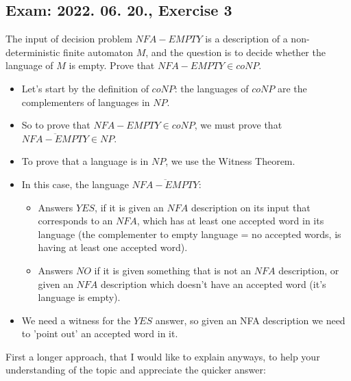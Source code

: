 \subsection{Exam: 2022. 06. 20., Exercise 3}


The input of decision problem $NFA-EMPTY$ is a description of a non-deterministic finite automaton $M$, and the question is to decide whether the language of $M$ is empty. Prove that $NFA-EMPTY \in{} coNP$.


\begin{itemize}
    \item Let's start by the definition of $coNP$: the languages of $coNP$ are the complementers of languages in $NP$.
    \item So to prove that $NFA-EMPTY \in{} coNP$, we must prove that $\overline{NFA-EMPTY} \in{} NP$.
    \item To prove that a language is in $NP$, we use the Witness Theorem.
    \item In this case, the language $\overline{NFA-EMPTY}$:
    \begin{itemize}
        \item Answers $YES$, if it is given an $NFA$ description on its input that corresponds to an $NFA$, which has at least one accepted word in its language (the complementer to empty language = no accepted words, is having at least one accepted word).
        \item Answers $NO$ if it is given something that is not an $NFA$ description, or given an $NFA$ description which doesn't have an accepted word (it's language is empty).
    \end{itemize}
    \item We need a witness for the $YES$ answer, so given an NFA description we need to 'point out' an accepted word in it.
\end{itemize}

First a longer approach, that I would like to explain anyways, to help your understanding of the topic and appreciate the quicker answer:

